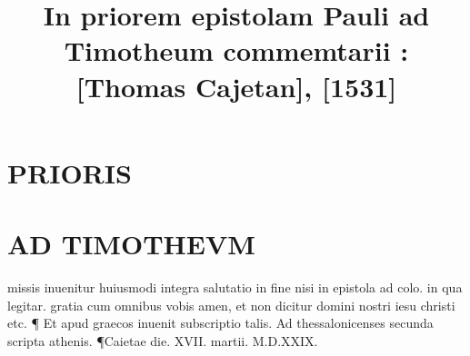 \documentclass{article}
\begin{document}
\date{}
        \title{In priorem epistolam Pauli ad Timotheum commemtarii : [Thomas Cajetan], [1531]}
\maketitle
\tableofcontents
\clearpage
\begin{pages} 
\beginnumbering
        
\section*{PRIORIS }
\section*{AD TIMOTHEVM }\pstart missis inuenitur huiusmodi integra salutatio in fine nisi in epistola ad colo. in qua legitar. gratia cum omnibus vobis amen, et non dicitur domini nostri iesu christi etc. ¶ Et apud graecos inuenit subscriptio talis. Ad thessalonicenses secunda scripta athenis. ¶Caietae die. XVII. martii. M.D.XXIX.  \pend
{}
{}

\end{pages}
\end{document}
